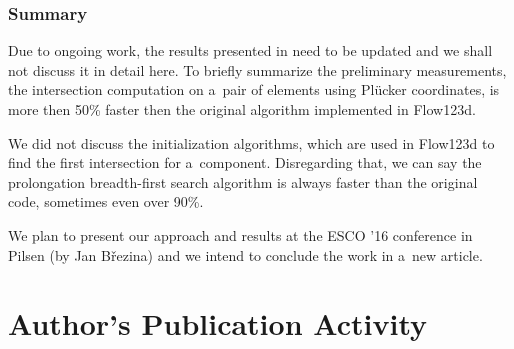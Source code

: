 \documentclass[dvipsnames,FM,Dis]{tulthesis}
\begin{document}
\subsection{Summary}
Due to ongoing work, the results presented in \cite{fris_dp_2015} need to be updated and we shall not discuss
it in detail here. To briefly summarize the preliminary measurements, the intersection computation
on a~pair of elements using Pl\"{u}cker coordinates, is more then 50\% faster then the original algorithm 
implemented in Flow123d.

We did not discuss the initialization algorithms, which are used in Flow123d to find the first intersection 
for a~component. Disregarding that, we can say the prolongation breadth-first search algorithm is always faster
than the original code, sometimes even over 90\%.

We plan to present our approach and results at the ESCO '16 conference in Pilsen (by Jan B{\v r}ezina) and
we intend to conclude the work in a~new article.




\chapter{Author's Publication Activity} \label{chap:publications}
\end{document}
